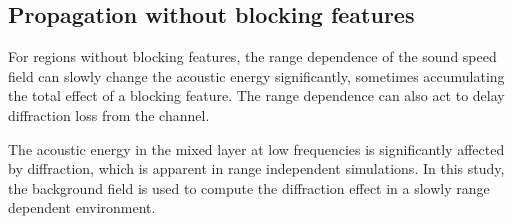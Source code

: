 \documentclass[preprint,NumberedRefs]{JASA}
\begin{document}
\subsection{Propagation without blocking features}

For regions without blocking features, the range dependence of the sound speed field can slowly change the acoustic energy significantly, sometimes accumulating the total effect of a blocking feature. The range dependence can also act to delay diffraction loss from the channel.

The acoustic energy in the mixed layer at low frequencies is significantly affected by diffraction, which is apparent in range independent simulations. In this study, the background field is used to compute the diffraction effect in a slowly range dependent environment.



\end{document}
